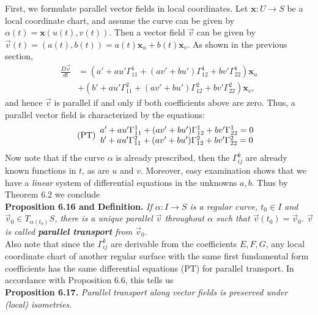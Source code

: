 \documentclass[leqno]{book}
\begin{document}
First, we formulate parallel vector fields in local coordinates.  Let $\mathbf x:U\to S$ be a local coordinate chart, and assume the curve can be given by $\alpha(t)=\mathbf x(u(t),v(t))$.  Then a vector field $\vec v$ can be given by $\vec v(t)=(a(t),b(t))=a(t)\mathbf x_u+b(t)\mathbf x_v$.  As shown in the previous section,
\begin{align*}
\frac{D\vec v}{dt}
&=\left(a'+au'\Gamma_{11}^1+(av'+bu')\Gamma_{12}^1+bv'\Gamma_{22}^1\right)\mathbf x_u\\
&+\left(b'+au'\Gamma_{11}^2+(av'+bu')\Gamma_{12}^2+bv'\Gamma_{22}^2\right)\mathbf x_v,
\end{align*}
and hence $\vec v$ is parallel if and only if both coefficients above are zero.  Thus, a parallel vector field is characterized by the equations:
\begin{equation}\tag{PT}\begin{array}{c l}a'+au'\Gamma_{11}^1+(av'+bu')\Gamma_{12}^1+bv'\Gamma_{22}^1=0\\b'+au'\Gamma_{11}^2+(av'+bu')\Gamma_{12}^2+bv'\Gamma_{22}^2=0\end{array}\end{equation}
Now note that if the curve $\alpha$ is already prescribed, then the $\Gamma_{ij}^k$ are already known functions in $t$, as are $u$ and $v$.  Moreover, easy examination shows that we have a \emph{linear} system of differential equations in the unknowns $a,b$.  Thus by Theorem 6.2 we conclude\\

\noindent\textbf{Proposition 6.16 and Definition.} \emph{If $\alpha:I\to S$ is a regular curve, $t_0\in I$ and $\vec v_0\in T_{\alpha(t_0)}S$, there is a unique parallel $\vec v$ throughout $\alpha$ such that $\vec v(t_0)=\vec v_0$.  $\vec v$ is called \textbf{parallel transport} from $\vec v_0$.}\\

\noindent Also note that since the $\Gamma_{ij}^k$ are derivable from the coefficients $E,F,G$, any local coordinate chart of another regular surface with the same first fundamental form coefficients has the same differential equations (PT) for parallel transport.  In accordance with Proposition 6.6, this tells us\\ %

\noindent\textbf{Proposition 6.17.} \emph{Parallel transport along vector fields is preserved under (local) isometries.}\\
\end{document}
